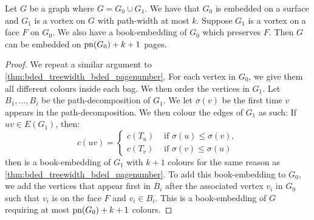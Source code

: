 \begin{lemma}\label{lem:preserved_faces_pagenumber}
	Let \(G\) be a graph where \(G = G_0 \cup G_1\). We have that \(G_0\) is embedded on a surface and \(G_1\) is a vortex on \(G\) with path-width at most \(k\). Suppose \(G_1\) is a vortex on a face \(F\) on \(G_0\). We also have a book-embedding of \(G_0\) which preserves \(F\). Then $G$ can be embedded on \(\operatorname{pn}(G_0) + k + 1\) pages. 
\end{lemma}

\begin{proof}
	We repeat a similar argument to \cref{thm:bded_treewidth_bded_pagenumber}. For each vertex in \(G_0\), we give them all different colours inside each bag. We then order the vertices in \(G_1\). Let \(B_1, \ldots, B_i\) be the path-decomposition of \(G_1\). We let \(\sigma(v)\) be the first time \(v\) appears in the path-decomposition. We then colour the edges of \(G_1\) as such: If \(uv \in E(G_1)\), then:
	\begin{equation}
		c(uv) = 
		\begin{cases}
			c(T_u) &\text{ if } \sigma(u) \leq \sigma(v),\\
			c(T_v) &\text{ if } \sigma(v) \leq \sigma(u)
		\end{cases}
	\end{equation}
	then is a book-embedding of \(G_1\) with \(k+1\) colours for the same reason as \cref{thm:bded_treewidth_bded_pagenumber}.
	To add this book-embedding to \(G_0\), we add the vertices that appear first in \(B_i\) after the associated vertex \(v_i\) in \(G_0\) such that \(v_i\) is on the face \(F\) and \(v_i \in B_i\). This is a book-embedding of \(G\) requiring at most \(\operatorname{pn}(G_0) + k + 1\) colours. 
\end{proof}

